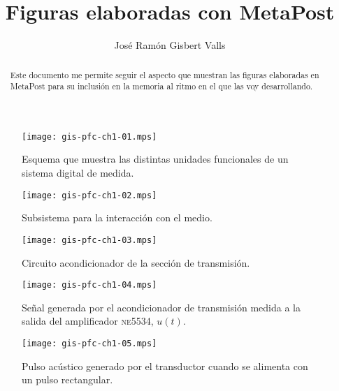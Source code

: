 \documentclass[a4paper,12pt]{article}
\title{Figuras elaboradas con MetaPost}
\author{José Ramón Gisbert Valls}
\begin{document}
\maketitle{}

\begin{abstract}
	Este documento me permite seguir el aspecto que muestran las figuras elaboradas en MetaPost para su inclusión en la memoria al ritmo en el que las voy desarrollando.
\end{abstract}

\listoffigures

\begin{figure}
	\begin{center}
		\texttt{[image: gis-pfc-ch1-01.mps]}
	\end{center}
	\caption[Sistema digital de medida]{Esquema que muestra las distintas unidades funcionales de un sistema digital de medida.}
	\label{fig:digmeasstm}
\end{figure}

\begin{figure}
	\begin{center}
		\texttt{[image: gis-pfc-ch1-02.mps]}
	\end{center}
	\caption[Subsistema para la interacción con el medio]{Subsistema para la interacción con el medio.}
	\label{fig:submedium}
\end{figure}

\begin{figure}
	\begin{center}
		\texttt{[image: gis-pfc-ch1-03.mps]}
	\end{center}
	\caption[Circuito acondicionador de la sección de transmisión]{Circuito acondicionador de la sección de transmisión.}
	\label{fig:txconditioner}
\end{figure}

\begin{figure}
	\begin{center}
		\texttt{[image: gis-pfc-ch1-04.mps]}
	\end{center}
	\caption[Señal a la salida del amplificador \textsc{ne5534}, $u(t)$]{Señal generada por el acondicionador de transmisión medida a la salida del amplificador \textsc{ne5534}, $u(t)$.}
	\label{fig:txacvo}
\end{figure}

\clearpage

\begin{figure}
	\begin{center}
		\texttt{[image: gis-pfc-ch1-05.mps]}
	\end{center}
	\caption[Pulso acústico generado por el transductor]{Pulso acústico generado por el transductor cuando se alimenta con un pulso rectangular.}
	\label{fig:pulse}
\end{figure}
\end{document}
